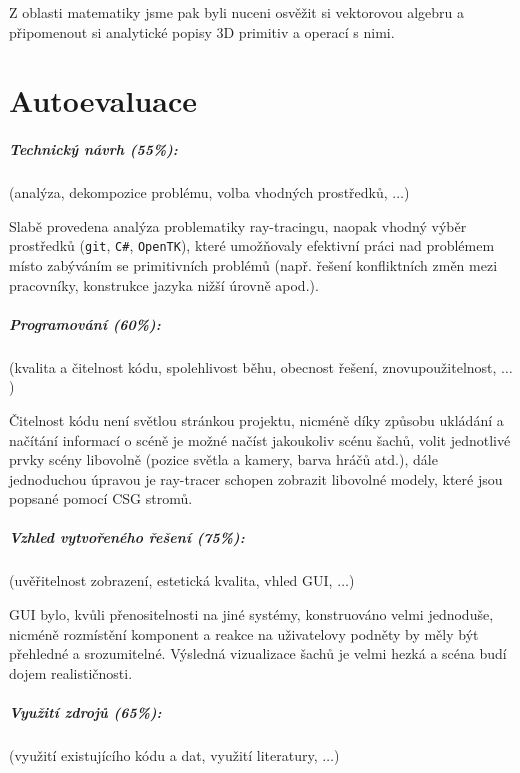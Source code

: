 \documentclass[12pt,a4paper,titlepage,final]{report}
\begin{document}
Z oblasti matematiky jsme pak byli nuceni osvěžit si vektorovou algebru a připomenout si analytické popisy 3D primitiv a operací s nimi.

\chapter{Autoevaluace}

\paragraph{Technický návrh (55\%):} (analýza, dekompozice problému, volba
vhodných prostředků, $\ldots$) 

Slabě provedena analýza problematiky ray-tracingu, naopak vhodný výběr prostředků (\texttt{git}, \texttt{C\#}, \texttt{OpenTK}), které umožňovaly efektivní práci nad problémem místo zabýváním se primitivních problémů (např. řešení konfliktních změn mezi pracovníky, konstrukce jazyka nižší úrovně apod.).

\paragraph{Programování (60\%):} (kvalita a čitelnost kódu, spolehlivost běhu,
obecnost řešení, znovupoužitelnost, $\ldots$)

Čitelnost kódu není světlou stránkou projektu, nicméně díky způsobu ukládání a načítání informací o scéně je možné načíst jakoukoliv scénu šachů, volit jednotlivé prvky scény libovolně (pozice světla a kamery, barva hráčů atd.), dále jednoduchou úpravou je ray-tracer schopen zobrazit libovolné modely, které jsou popsané pomocí CSG stromů. 


\paragraph{Vzhled vytvořeného řešení (75\%):} (uvěřitelnost zobrazení,
estetická kvalita, vhled GUI, $\ldots$)

GUI bylo, kvůli přenositelnosti na jiné systémy, konstruováno velmi jednoduše, nicméně rozmístění komponent a reakce na uživatelovy podněty by měly být přehledné a srozumitelné. Výsledná vizualizace šachů je velmi hezká a scéna budí dojem realističnosti. 

\paragraph{Využití zdrojů (65\%):} (využití existujícího kódu a dat, využití
literatury, $\ldots$)
\end{document}

